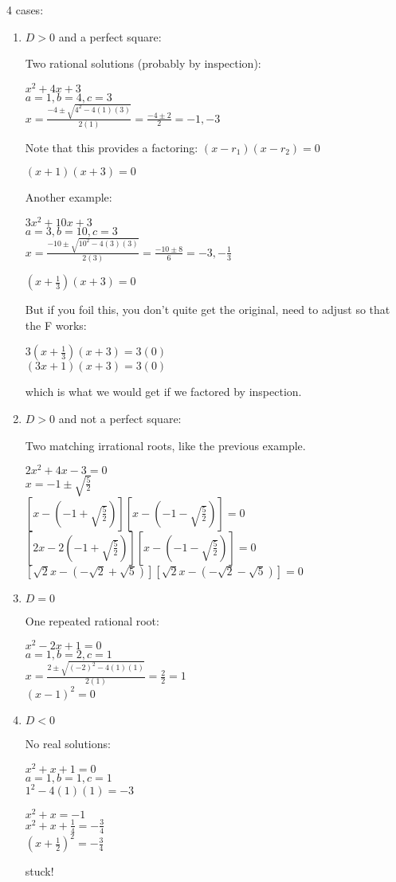 \documentclass[letterpaper,12pt,fleqn]{article}
\begin{document}
4 cases:
\begin{enumerate}
\item $D>0$ and a perfect square:

  Two rational solutions (probably by inspection):

  $x^2+4x+3$ \\
  $a=1, b=4, c=3$ \\
  $x=\frac{-4\pm\sqrt{4^2-4(1)(3)}}{2(1)}=\frac{-4\pm2}{2}=-1,-3$

  Note that this provides a factoring: $(x-r_1)(x-r_2)=0$

  $(x+1)(x+3)=0$

  Another example:

  $3x^2+10x+3$ \\
  $a=3, b=10, c=3$ \\
  $x=\frac{-10\pm\sqrt{10^2-4(3)(3)}}{2(3)}=\frac{-10\pm8}{6}=-3,-\frac{1}{3}$

  $\left(x+\frac{1}{3}\right)(x+3)=0$

  But if you foil this, you don't quite get the original, need to adjust so
  that the F works:
  
  $3\left(x+\frac{1}{3}\right)(x+3)=3(0)$ \\
  $(3x+1)(x+3)=3(0)$

  which is what we would get if we factored by inspection.

\item $D>0$ and not a perfect square:

  Two matching irrational roots, like the previous example.

  $2x^2+4x-3=0$ \\
  $x=-1\pm\sqrt{\frac{5}{2}}$ \\
  $[x-(-1+\sqrt{\frac{5}{2}})][x-(-1-\sqrt{\frac{5}{2}})]=0$ \\
  $[2x-2(-1+\sqrt{\frac{5}{2}})][x-(-1-\sqrt{\frac{5}{2}})]=0$ \\
  $[\sqrt{2}x-(-\sqrt{2}+\sqrt{5})][\sqrt{2}x-(-\sqrt{2}-\sqrt{5})]=0$ \\

\item $D=0$

  One repeated rational root:

  $x^2-2x+1=0$ \\
  $a=1, b=2, c=1$ \\
  $x=\frac{2\pm\sqrt{(-2)^2-4(1)(1)}}{2(1)}=\frac{2}{2}=1$ \\
  $(x-1)^2=0$

\item $D<0$

  No real solutions:

  $x^2+x+1=0$ \\
  $a=1, b=1, c=1$ \\
  $1^2-4(1)(1)=-3$

  $x^2+x=-1$ \\
  $x^2+x+\frac{1}{4}=-\frac{3}{4}$ \\
  $\left(x+\frac{1}{2}\right)^2=-\frac{3}{4}$

  stuck!
\end{enumerate}
\end{document}

